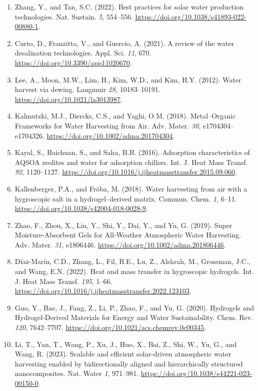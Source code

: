 \documentclass[11pt]{article}
\begin{document}
\begin{enumerate}[leftmargin=2em,itemsep=0.25em]
\item Zhang, Y., and Tan, S.C. (2022). Best practices for solar water production technologies. Nat. Sustain. \textit{5}, 554--556. \url{https://doi.org/10.1038/s41893-022-00880-1}.
\item Curto, D., Franzitta, V., and Guercio, A. (2021). A review of the water desalination technologies. Appl. Sci. \textit{11}, 670. \url{https://doi.org/10.3390/app11020670}.
\item Lee, A., Moon, M.W., Lim, H., Kim, W.D., and Kim, H.Y. (2012). Water harvest via dewing. Langmuir \textit{28}, 10183--10191. \url{https://doi.org/10.1021/la3013987}.
\item Kalmutzki, M.J., Diercks, C.S., and Yaghi, O.M. (2018). Metal--Organic Frameworks for Water Harvesting from Air. Adv. Mater. \textit{30}, e1704304--e1704326. \url{https://doi.org/10.1002/adma.201704304}.
\item Kayal, S., Baichuan, S., and Saha, B.B. (2016). Adsorption characteristics of AQSOA zeolites and water for adsorption chillers. Int. J. Heat Mass Transf. \textit{92}, 1120--1127. \url{https://doi.org/10.1016/j.ijheatmasstransfer.2015.09.060}.
\item Kallenberger, P.A., and Fröba, M. (2018). Water harvesting from air with a hygroscopic salt in a hydrogel--derived matrix. Commun. Chem. \textit{1}, 6--11. \url{https://doi.org/10.1038/s42004-018-0028-9}.
\item Zhao, F., Zhou, X., Liu, Y., Shi, Y., Dai, Y., and Yu, G. (2019). Super Moisture-Absorbent Gels for All-Weather Atmospheric Water Harvesting. Adv. Mater. \textit{31}, e1806446. \url{https://doi.org/10.1002/adma.201806446}.
\item Díaz-Marín, C.D., Zhang, L., Fil, B.E., Lu, Z., Alshrah, M., Grossman, J.C., and Wang, E.N. (2022). Heat and mass transfer in hygroscopic hydrogels. Int. J. Heat Mass Transf. \textit{195}, 1--66. \url{https://doi.org/10.1016/j.ijheatmasstransfer.2022.123103}.
\item Guo, Y., Bae, J., Fang, Z., Li, P., Zhao, F., and Yu, G. (2020). Hydrogels and Hydrogel-Derived Materials for Energy and Water Sustainability. Chem. Rev. \textit{120}, 7642--7707. \url{https://doi.org/10.1021/acs.chemrev.0c00345}.
\item Li, T., Yan, T., Wang, P., Xu, J., Huo, X., Bai, Z., Shi, W., Yu, G., and Wang, R. (2023). Scalable and efficient solar-driven atmospheric water harvesting enabled by bidirectionally aligned and hierarchically structured nanocomposites. Nat. Water \textit{1}, 971--981. \url{https://doi.org/10.1038/s44221-023-00150-0}.

\end{enumerate}
\end{document}
